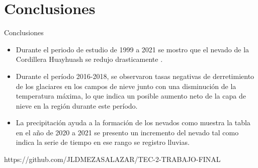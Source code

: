 \documentclass[handout,t]{beamer}
\begin{document}
\section{Conclusiones}
\begin{frame}{Conclusiones}
  \begin{itemize}
    \item \small{Durante el periodo de estudio de 1999 a 2021 se mostro que el nevado de la Cordillera Huayhuash se redujo drasticamente .}
    \item \small{Durante el período 2016-2018, se observaron tasas negativas de derretimiento de los glaciares en los campos de nieve junto con una disminución de la temperatura máxima, lo que indica un posible aumento neto de la capa de nieve en la región durante este período.}
    \item \small{La precipitación ayuda a la formación de los nevados como muestra la tabla en el año de 2020 a 2021 se presento un incremento del nevado tal como indica la serie de tiempo en ese rango se registro lluvias.}
    \end{itemize}
\end{frame}
https://github.com/JLDMEZASALAZAR/TEC-2-TRABAJO-FINAL
\end{document}
